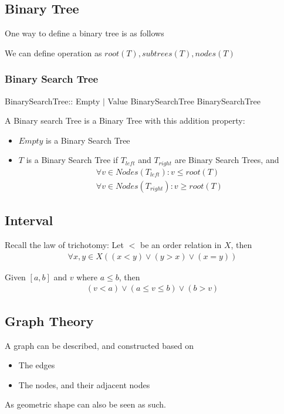 \documentclass{article}
\theoremstyle{plain}
\theoremstyle{definition}
\begin{document}
\subsection{Binary Tree}
One way to define a binary tree is as follows

We can define operation as $root(T), subtrees(T), nodes(T)$

\subsubsection{Binary Search Tree}
    \begin{algorithmic}
        \State BinarySearchTree:: Empty $\mid$ Value BinarySearchTree BinarySearchTree
    \end{algorithmic}
    A Binary search Tree is a Binary Tree with this addition property:
    \begin{itemize}
        \item $Empty$ is a Binary Search Tree
        \item $T$ is a Binary Search Tree if
            $T_{left}$ and $T_{right}$ are Binary Search Trees, and
            \begin{gather*}
                \forall v\in Nodes(T_{left}): v \leq root(T)\\
                \forall v\in Nodes(T_{right}): v \geq root(T)
            \end{gather*}
    \end{itemize}

\subsection{Interval}
    Recall the law of trichotomy: Let $<$ be an order relation in $X$, then
    \begin{align*}
        \forall x, y\in X ((x < y) \lor (y > x) \lor (x = y))
    \end{align*}

    Given $[a, b]$ and $v$ where $a \leq b$, then
    \begin{gather*}
        (v < a) \lor (a\leq v\leq b) \lor (b > v)
    \end{gather*}

\subsection{Graph Theory}
A graph can be described, and constructed based on
\begin{itemize}
    \item The edges
    \item The nodes, and their adjacent nodes
\end{itemize}
As geometric shape can also be seen as such.
\end{document}
